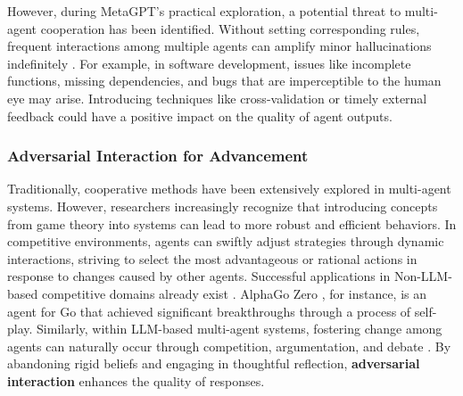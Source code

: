 However, during MetaGPT's practical exploration, a potential threat to multi-agent cooperation has been identified. Without setting corresponding rules, frequent interactions among multiple agents can amplify minor hallucinations indefinitely \cite{DBLP:journals/corr/abs-2308-00352}. For example, in software development, issues like incomplete functions, missing dependencies, and bugs that are imperceptible to the human eye may arise. Introducing techniques like cross-validation \cite{DBLP:journals/corr/abs-2307-07924} or timely external feedback could have a positive impact on the quality of agent outputs.

\subsubsection{Adversarial Interaction for Advancement} \label{sec:Adversarial Interactions for Advancement}
Traditionally, cooperative methods have been extensively explored in multi-agent systems. However, researchers increasingly recognize that introducing concepts from game theory \cite{DBLP:books/daglib/0027240,DBLP:journals/sigact/Aziz10} into systems can lead to more robust and efficient behaviors. In competitive environments, agents can swiftly adjust strategies through dynamic interactions, striving to select the most advantageous or rational actions in response to changes caused by other agents. Successful applications in Non-LLM-based competitive domains already exist \cite{DBLP:journals/nature/SilverHMGSDSAPL16,Campbell2002DeepB}. AlphaGo Zero \cite{DBLP:journals/nature/SilverSSAHGHBLB17}, for instance, is an agent for Go that achieved significant breakthroughs through a process of self-play. Similarly, within LLM-based multi-agent systems, fostering change among agents can naturally occur through competition, argumentation, and debate \cite{DBLP:conf/emnlp/LewisYDPB17,DBLP:journals/corr/abs-1805-00899}. By abandoning rigid beliefs and engaging in thoughtful reflection, \textbf{adversarial interaction} enhances the quality of responses.

